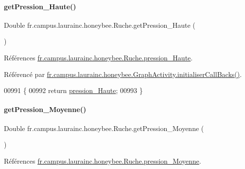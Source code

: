 \paragraph{\texorpdfstring{get\+Pression\+\_\+\+Haute()}{getPression\_Haute()}}
{\footnotesize\ttfamily Double fr.\+campus.\+laurainc.\+honeybee.\+Ruche.\+get\+Pression\+\_\+\+Haute (\begin{DoxyParamCaption}{ }\end{DoxyParamCaption})}



Références \hyperlink{classfr_1_1campus_1_1laurainc_1_1honeybee_1_1_ruche_a5218589d82413783a85b71a8f765e565}{fr.\+campus.\+laurainc.\+honeybee.\+Ruche.\+pression\+\_\+\+Haute}.



Référencé par \hyperlink{classfr_1_1campus_1_1laurainc_1_1honeybee_1_1_graph_activity_a8dc56c3e0744bcb9295ad10e726b5fdb}{fr.\+campus.\+laurainc.\+honeybee.\+Graph\+Activity.\+initialiser\+Call\+Backs()}.


\begin{DoxyCode}
00991                                       \{
00992         \textcolor{keywordflow}{return} \hyperlink{classfr_1_1campus_1_1laurainc_1_1honeybee_1_1_ruche_a5218589d82413783a85b71a8f765e565}{pression\_Haute};
00993     \}
\end{DoxyCode}
\mbox{\label{classfr_1_1campus_1_1laurainc_1_1honeybee_1_1_ruche_a5b15bae9751b1ba2934abe1d1527b0cb}} 
\paragraph{\texorpdfstring{get\+Pression\+\_\+\+Moyenne()}{getPression\_Moyenne()}}
{\footnotesize\ttfamily Double fr.\+campus.\+laurainc.\+honeybee.\+Ruche.\+get\+Pression\+\_\+\+Moyenne (\begin{DoxyParamCaption}{ }\end{DoxyParamCaption})}



Références \hyperlink{classfr_1_1campus_1_1laurainc_1_1honeybee_1_1_ruche_afcfb5de514add7b23ac40ecf0913ba0f}{fr.\+campus.\+laurainc.\+honeybee.\+Ruche.\+pression\+\_\+\+Moyenne}.



